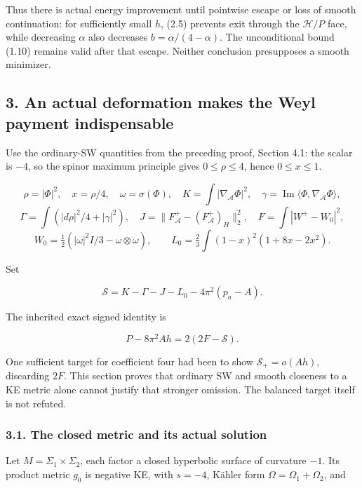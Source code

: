 \documentclass[
  10pt,
]{article}
\begin{document}
Thus there is actual energy improvement until pointwise escape or loss
of smooth continuation: for sufficiently small \(h\), (2.5) prevents
exit through the \(\mathcal H/P\) face, while decreasing \(\alpha\) also
decreases \(b=\alpha/(4-\alpha)\). The unconditional bound (1.10)
remains valid after that escape. Neither conclusion presupposes a smooth
minimizer.

\hypertarget{an-actual-deformation-makes-the-weyl-payment-indispensable}{%
\subsection{3. An actual deformation makes the Weyl payment
indispensable}\label{an-actual-deformation-makes-the-weyl-payment-indispensable}}

Use the ordinary-SW quantities from the preceding proof, Section 4.1:
the scalar is \(-4\), so the spinor maximum principle gives
\(0\le\rho\le4\), hence \(0\le x\le1\).

\[
 \rho=|\Phi|^2,\quad x=\rho/4,\quad \omega=\sigma(\Phi),\quad
 K=\int|\nabla_{\mathcal A}\Phi|^2,\quad
 \gamma=\operatorname{Im}\langle\Phi,\nabla_{\mathcal A}\Phi\rangle,
\] \[
 \Gamma=\int(|d\rho|^2/4+|\gamma|^2),\quad
 J=\|F_{\mathcal A}^+-(F_{\mathcal A}^+)_H\|_2^2,
 \quad F=\int|W^+-W_0|^2,
\] \[
 W_0=\tfrac12(|\omega|^2I/3-\omega\otimes\omega),\qquad
 L_0=\tfrac23\int(1-x)^2(1+8x-2x^2).
\]

Set

\[
 \mathscr S=K-\Gamma-J-L_0-4\pi^2(p_a-A).
\]

The inherited exact signed identity is

\[
              P-8\pi^2Ah=2(2F-\mathscr S).                    \tag{3.1}
\]

One sufficient target for coefficient four had been to show
\(\mathscr S_+=o(Ah)\), discarding \(2F\). This section proves that
ordinary SW and smooth closeness to a KE metric alone cannot justify
that stronger omission. The balanced target itself is not refuted.

\hypertarget{the-closed-metric-and-its-actual-solution}{%
\subsubsection{3.1. The closed metric and its actual
solution}\label{the-closed-metric-and-its-actual-solution}}

Let \(M=\Sigma_1\times\Sigma_2\), each factor a closed hyperbolic
surface of curvature \(-1\). Its product metric \(g_0\) is negative KE,
with \(s=-4\), Kähler form \(\Omega=\Omega_1+\Omega_2\), and
\end{document}
